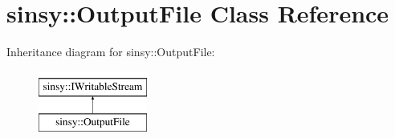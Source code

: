 \hypertarget{classsinsy_1_1OutputFile}{\section{sinsy\-:\-:\-Output\-File \-Class \-Reference}
\label{classsinsy_1_1OutputFile}
}
\-Inheritance diagram for sinsy\-:\-:\-Output\-File\-:\begin{figure}[H]
\begin{center}
\leavevmode
\includegraphics[height=2.000000cm]{classsinsy_1_1OutputFile}
\end{center}
\end{figure}
